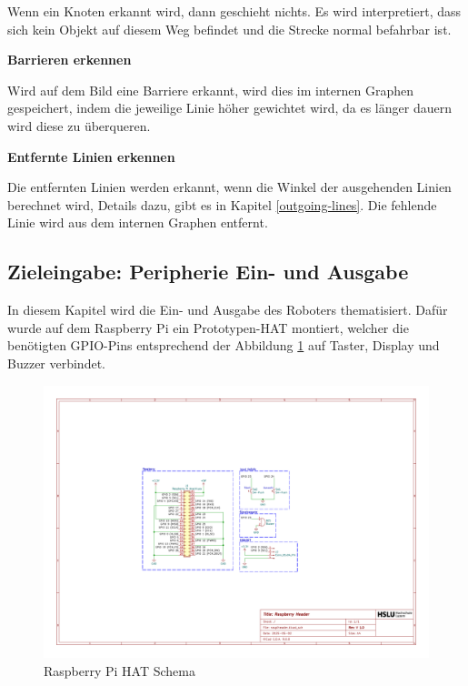 Wenn ein Knoten erkannt wird, dann geschieht nichts. Es wird interpretiert, dass sich kein Objekt auf diesem Weg befindet und die Strecke normal befahrbar ist.

\textbf{Barrieren erkennen}

Wird auf dem Bild eine Barriere erkannt, wird dies im internen Graphen gespeichert, indem die jeweilige Linie höher gewichtet wird, da es länger dauern wird diese zu überqueren.

\textbf{Entfernte Linien erkennen}

Die entfernten Linien werden erkannt, wenn die Winkel der ausgehenden Linien berechnet wird, Details dazu, gibt es in Kapitel \ref{outgoing-lines}. Die fehlende Linie wird aus dem internen Graphen entfernt.

\newpage
\subsection{Zieleingabe: Peripherie Ein- und Ausgabe}

In diesem Kapitel wird die Ein- und Ausgabe des Roboters thematisiert.
Dafür wurde auf dem Raspberry Pi ein Prototypen-HAT montiert, welcher die benötigten GPIO-Pins entsprechend der Abbildung \ref{fig:raspiheader-schema} auf Taster, Display und Buzzer verbindet.

\begin{figure}[H]
    \centering
    \includegraphics[width=\linewidth, trim=7.5cm 6cm 10cm 6cm, clip]{assets/ET/PCB/raspiheader.pdf}
    \caption{Raspberry Pi HAT Schema}
    \label{fig:raspiheader-schema}
\end{figure}

